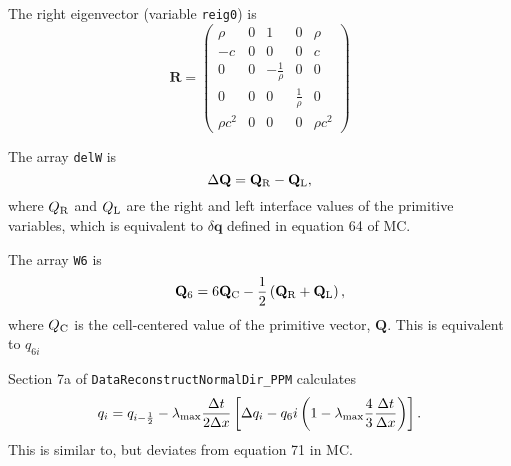 \documentclass[preprint,11pt]{aastex}
\newcommand{\beq}{\begin{equation}}
\newcommand{\eeq}{\end{equation}}
\begin{document}
The right eigenvector (variable \verb!reig0!) is
\beq
\mathbf{R} = 
\begin{pmatrix}
\rho & 0 & 1 & 0 & \rho \\
-c & 0 & 0 & 0 & c \\
0 & 0 & -\frac{1}{\rho} & 0 & 0 \\
0 & 0 & 0 & \frac{1}{\rho} & 0 \\
\rho c^2 & 0 & 0 & 0 & \rho c^2
\end{pmatrix}
\eeq

The array \verb!delW! is
\beq
\Delta \mathbf{Q} = \mathbf{Q}_{\rm R} - \mathbf{Q}_{\rm L},
\eeq
where $Q_{\rm R}$ and $Q_{\rm L}$ are the right and left interface values of the primitive variables, which is equivalent to $\delta \mathbf{q}$ defined in equation 64 of MC.

The array \verb!W6! is
\beq
\mathbf{Q}_6 = 6 \mathbf{Q}_{\rm C} - \frac{1}{2} \left( \mathbf{Q}_{\rm R} + \mathbf{Q}_{\rm L} \right),
\eeq
where $Q_{\rm C}$ is the cell-centered value of the primitive vector, $\mathbf{Q}$.  This is equivalent to $q_{6i}$

Section 7a of \verb!DataReconstructNormalDir_PPM! calculates
\beq
q_i = q_{i-\frac{1}{2}} - \lambda_{\rm max} \frac{\Delta t}{2 \Delta x} \left[ \Delta q_i - q_6i \left( 1 - \lambda_{\rm max} \frac{4}{3} \frac{\Delta t}{\Delta x}  \right) \right].
\eeq
This is similar to, but deviates from equation 71 in MC. 
\end{document}
